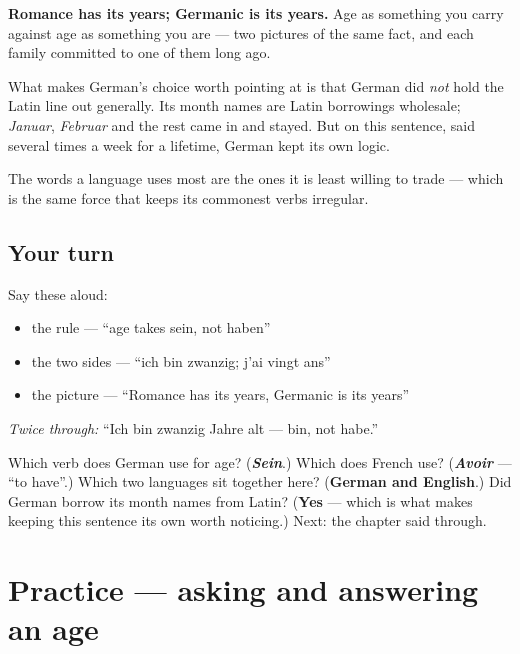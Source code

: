 \begin{culture}
\textbf{Romance has its years; Germanic is its years.} Age as something you carry against age as something you are — two pictures of the same fact, and each family committed to one of them long ago.

What makes German's choice worth pointing at is that German did \emph{not} hold the Latin line out generally. Its month names are Latin borrowings wholesale; \emph{Januar}, \emph{Februar} and the rest came in and stayed. But on this sentence, said several times a week for a lifetime, German kept its own logic.

The words a language uses most are the ones it is least willing to trade — which is the same force that keeps its commonest verbs irregular.
\end{culture}

\subsection*{Your turn}
Say these aloud:

\begin{itemize}
\raggedright
  \item the rule — \textquotedblleft{}age takes sein, not haben\textquotedblright{}
  \item the two sides — \textquotedblleft{}ich bin zwanzig; j'ai vingt ans\textquotedblright{}
  \item the picture — \textquotedblleft{}Romance has its years, Germanic is its years\textquotedblright{}
\end{itemize}

\emph{Twice through:} \textquotedblleft{}Ich bin zwanzig Jahre alt — bin, not habe.\textquotedblright{}

\begin{tcolorbox}[breakable,colback=teal!4,colframe=teal!35!black,title={Before you move on}]
Which verb does German use for age? (\emph{\textbf{Sein}}.) Which does French use? (\emph{\textbf{Avoir}} — \textquotedblleft{}to have\textquotedblright{}.) Which two languages sit together here? (\textbf{German and English}.) Did German borrow its month names from Latin? (\textbf{Yes} — which is what makes keeping this sentence its own worth noticing.) Next: the chapter said through.
\end{tcolorbox}
\section[Practice]{Practice — asking and answering an age}

